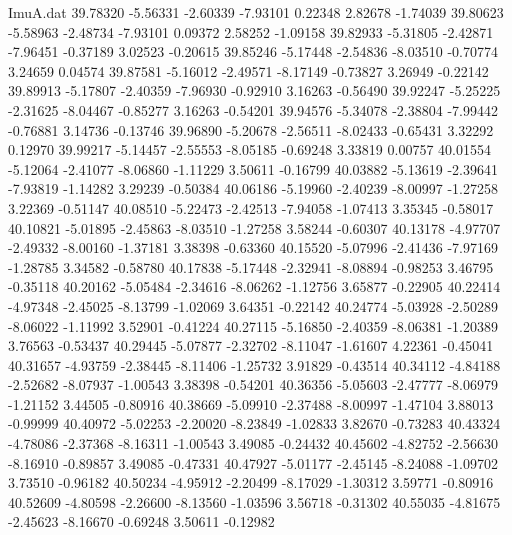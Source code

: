 \begin{filecontents}{ImuA.dat}
  39.78320   -5.56331   -2.60339   -7.93101    0.22348    2.82678   -1.74039
  39.80623   -5.58963   -2.48734   -7.93101    0.09372    2.58252   -1.09158
  39.82933   -5.31805   -2.42871   -7.96451   -0.37189    3.02523   -0.20615
  39.85246   -5.17448   -2.54836   -8.03510   -0.70774    3.24659    0.04574
  39.87581   -5.16012   -2.49571   -8.17149   -0.73827    3.26949   -0.22142
  39.89913   -5.17807   -2.40359   -7.96930   -0.92910    3.16263   -0.56490
  39.92247   -5.25225   -2.31625   -8.04467   -0.85277    3.16263   -0.54201
  39.94576   -5.34078   -2.38804   -7.99442   -0.76881    3.14736   -0.13746
  39.96890   -5.20678   -2.56511   -8.02433   -0.65431    3.32292    0.12970
  39.99217   -5.14457   -2.55553   -8.05185   -0.69248    3.33819    0.00757
  40.01554   -5.12064   -2.41077   -8.06860   -1.11229    3.50611   -0.16799
  40.03882   -5.13619   -2.39641   -7.93819   -1.14282    3.29239   -0.50384
  40.06186   -5.19960   -2.40239   -8.00997   -1.27258    3.22369   -0.51147
  40.08510   -5.22473   -2.42513   -7.94058   -1.07413    3.35345   -0.58017
  40.10821   -5.01895   -2.45863   -8.03510   -1.27258    3.58244   -0.60307
  40.13178   -4.97707   -2.49332   -8.00160   -1.37181    3.38398   -0.63360
  40.15520   -5.07996   -2.41436   -7.97169   -1.28785    3.34582   -0.58780
  40.17838   -5.17448   -2.32941   -8.08894   -0.98253    3.46795   -0.35118
  40.20162   -5.05484   -2.34616   -8.06262   -1.12756    3.65877   -0.22905
  40.22414   -4.97348   -2.45025   -8.13799   -1.02069    3.64351   -0.22142
  40.24774   -5.03928   -2.50289   -8.06022   -1.11992    3.52901   -0.41224
  40.27115   -5.16850   -2.40359   -8.06381   -1.20389    3.76563   -0.53437
  40.29445   -5.07877   -2.32702   -8.11047   -1.61607    4.22361   -0.45041
  40.31657   -4.93759   -2.38445   -8.11406   -1.25732    3.91829   -0.43514
  40.34112   -4.84188   -2.52682   -8.07937   -1.00543    3.38398   -0.54201
  40.36356   -5.05603   -2.47777   -8.06979   -1.21152    3.44505   -0.80916
  40.38669   -5.09910   -2.37488   -8.00997   -1.47104    3.88013   -0.99999
  40.40972   -5.02253   -2.20020   -8.23849   -1.02833    3.82670   -0.73283
  40.43324   -4.78086   -2.37368   -8.16311   -1.00543    3.49085   -0.24432
  40.45602   -4.82752   -2.56630   -8.16910   -0.89857    3.49085   -0.47331
  40.47927   -5.01177   -2.45145   -8.24088   -1.09702    3.73510   -0.96182
  40.50234   -4.95912   -2.20499   -8.17029   -1.30312    3.59771   -0.80916
  40.52609   -4.80598   -2.26600   -8.13560   -1.03596    3.56718   -0.31302
  40.55035   -4.81675   -2.45623   -8.16670   -0.69248    3.50611   -0.12982

\end{filecontents}

